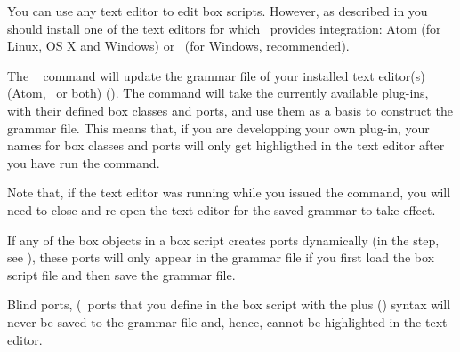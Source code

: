 You can use any text editor to edit box scripts. However, as described in  you should install one of the text editors for which \US\ provides integration: Atom (for Linux, OS X and Windows) or \NPP\ (for Windows, recommended).

The \US\  command will update the grammar file of your installed text editor(s) (Atom, \NPP\ or both) (). The command will take the currently available plug-ins, with their defined box classes and ports, and use them as a basis to construct the grammar file. This means that, if you are developping your own plug-in, your names for box classes and ports will only get highligthed in the text editor after you have run the  command. 

Note that, if the text editor was running while you issued the  command, you will need to close and re-open the text editor for the saved grammar to take effect.

If any of the box objects in a box script creates ports dynamically (in the  step, see ), these ports will only appear in the grammar file if you first load the box script file and then save the grammar file.

Blind ports, (\ie\ ports that you define in the box script with the plus (\code{+}) syntax will never be saved to the grammar file and, hence, cannot be highlighted in the text editor.

